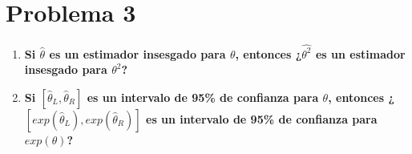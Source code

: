 \section*{Problema 3}

\begin{enumerate}
    \item \textbf{Si $\hat{\theta}$ es un estimador insesgado para $\theta$, entonces ¿$\hat{\theta^2}$ es un estimador insesgado para $\theta^2$?}
    \item \textbf{Si $[\hat{\theta}_L, \hat{\theta}_R]$ es un intervalo de 95\% de confianza para $\theta$, entonces ¿$[exp(\hat{\theta}_L),exp(\hat{\theta}_R)]$ es un intervalo de 95\% de confianza para $exp(\theta)$?}
\end{enumerate}